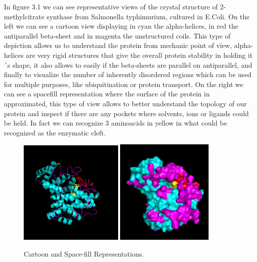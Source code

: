 \documentclass[a4paper,english,12pt,bibliography=totoc]{scrreprt}
\begin{document}
In figure 3.1 we can see representative views of the crystal structure of 2-methylcitrate synthase from Salmonella typhimurium, cultured in E.Coli.
On the left we can see a cartoon view displaying in cyan the alpha-helices, in red the antiparallel beta-sheet and in magenta the unstructured coils.
This type of depiction allows us to understand the protein from mechanic point of view, alpha-helices are very rigid structures that give the overall protein stability in holding it´s shape, it also allows to easily if the beta-sheets are parallel on antiparallel, and finally to visualize the number of inherently disordered regions which can be used for multiple purposes, like ubiquitination or protein transport.
On the right we can see a spacefill representation where the surface of the protein in  approximated, this type of view allows to better understand the topology of our protein and inspect if there are any pockets where solvents, ions or ligands could be held.
In fact we can recognize 3 aminoacids in yellow in what could be recognized as the enzymatic cleft.
\begin{figure}[H]
        \centering
        \includegraphics[width=0.45\textwidth]{Project 3/cartoonnew.png}
        \includegraphics[width=0.42\textwidth]{Project 3/surfacenew.png}
	    \caption{Cartoon and Space-fill Representations. }
\end{figure}
\end{document}
